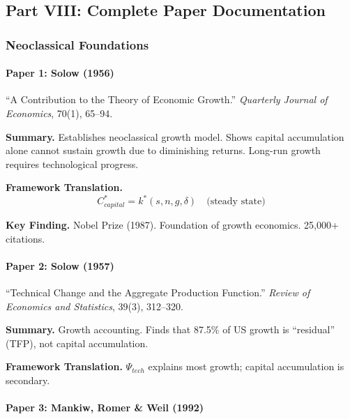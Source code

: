 \subsection{Part VIII: Complete Paper Documentation}

\subsubsection{Neoclassical Foundations}

\paragraph{Paper 1: Solow (1956)}

``A Contribution to the Theory of Economic Growth.''
\textit{Quarterly Journal of Economics}, 70(1), 65--94.

\textbf{Summary.}
Establishes neoclassical growth model. Shows capital accumulation alone cannot 
sustain growth due to diminishing returns. Long-run growth requires technological progress.

\textbf{Framework Translation.}
\begin{equation}
C^*_{capital} = k^*(s, n, g, \delta) \quad \text{(steady state)}
\end{equation}

\textbf{Key Finding.}
Nobel Prize (1987). Foundation of growth economics. 25,000+ citations.

\paragraph{Paper 2: Solow (1957)}

``Technical Change and the Aggregate Production Function.''
\textit{Review of Economics and Statistics}, 39(3), 312--320.

\textbf{Summary.}
Growth accounting. Finds that 87.5\% of US growth is ``residual'' (TFP), 
not capital accumulation.

\textbf{Framework Translation.}
$\Psi_{tech}$ explains most growth; capital accumulation is secondary.

\paragraph{Paper 3: Mankiw, Romer \& Weil (1992)}

